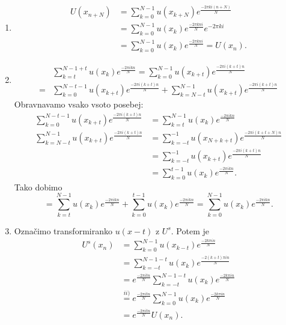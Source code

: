 \documentclass[mat2, tisk]{fmfdelo}
\begin{document}
\begin{dokaz}
  \hfill
\begin{enumerate}
  \item[i)]
  \begin{align*}
    U(x_{n+N}) &= \sum_{k=0}^{N-1} u(x_{k+N}) e^{\frac{-2\pi k i(n+N)}{N}} \\
    &= \sum_{k=0}^{N-1} u(x_k) e^{\frac{-2\pi k n i}{N}} e^{-2\pi k i} \\
    &= \sum_{k=0}^{N-1} u(x_k) e^{\frac{-2\pi k n i}{N}} = U(x_n).
  \end{align*}
  \item[ii)]
  \begin{align*}
    &\sum_{k=t}^{N-1 + t} u(x_k) e^{\frac{-2\pi i k n}{N}} = \sum_{k=0}^{N-1} u(x_{k+t}) e^{\frac{-2\pi i (k+t) n}{N}} \\
    =&\sum_{k=0}^{N-t-1} u(x_{k+t}) e^{\frac{-2\pi i (k+t) n}{N}} + 
    \sum_{k=N-t}^{N-1} u(x_{k+t}) e^{\frac{-2\pi i (k+t) n}{N}}
  \end{align*}
Obravnavamo vsako vsoto posebej: 
\begin{align*}
\sum_{k=0}^{N-t-1} u(x_{k+t}) e^{\frac{-2\pi i (k+t) n}{N}} &= 
\sum_{k=t}^{N-1} u(x_{k}) e^{\frac{-2\pi i k n}{N}}\\[5mm]
  \sum_{k=N-t}^{N-1} u(x_{k+t}) e^{\frac{-2\pi i (k+t) n}{N}} &= 
  \sum_{k=-t}^{-1} u(x_{N+k+t}) e^{\frac{-2\pi i (k+t+N) n}{N}}  \\
  &= \sum_{k=-t}^{-1} u(x_{k+t}) e^{\frac{-2\pi i (k+t) n}{N}} \\
  &= \sum_{k=0}^{t-1} u(x_{k}) e^{\frac{-2\pi i k n}{N}}.
\end{align*}
Tako dobimo 
$$
= \sum_{k=t}^{N-1} u(x_{k}) e^{\frac{-2\pi i k n}{N}} + \sum_{k=0}^{t-1} u(x_{k}) e^{\frac{-2\pi i k n}{N}} = 
\sum_{k=0}^{N-1} u(x_{k}) e^{\frac{-2\pi i k n}{N}}.
$$

\item[iii)] 
Označimo transformiranko $u(x-t)$ z $U^s$. Potem je 
  \begin{align*}
    U^s(x_{n}) &= \sum_{k=0}^{N-1} u(x_{k-t}) e^{\frac{-2k \pi i n}{N}} \\
    &= \sum_{k=-t}^{N-1-t} u(x_{k}) e^{\frac{-2(k+t) \pi i n}{N}} \\
    &= e^{\frac{-2\pi i t n}{N}} \sum_{k=-t}^{N-1-t} u(x_{k}) e^{\frac{-2k \pi i n}{N}}  \\
    &\stackrel{ii)}{=} e^{\frac{-2\pi i t n}{N}} \sum_{k=0}^{N-1} u(x_{k}) e^{\frac{-2k \pi i n}{N}} \\
    &= e^{\frac{-2\pi i t n}{N}} U(x_n).
  \end{align*}


\end{enumerate}
\end{dokaz}
\end{document}
